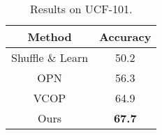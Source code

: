 \documentclass[runningheads]{llncs}
\begin{document}
\begin{table}[!h]
	\caption{Results on UCF-101.}
	\label{tab:ucf}
	\centering
	\begin{tabular}{c|c}
		\hline
		\textbf{Method} & \textbf{Accuracy}  \\
		\hline\hline
		Shuffle \& Learn \cite{misra2016shuffle} & 50.2 \\
		OPN \cite{lee2017unsupervised} & 56.3 \\
		VCOP \cite{xu2019self} &  64.9  \\
		Ours  &  \textbf{67.7}  \\  \hline
	\end{tabular}
\end{table}
\end{document}

